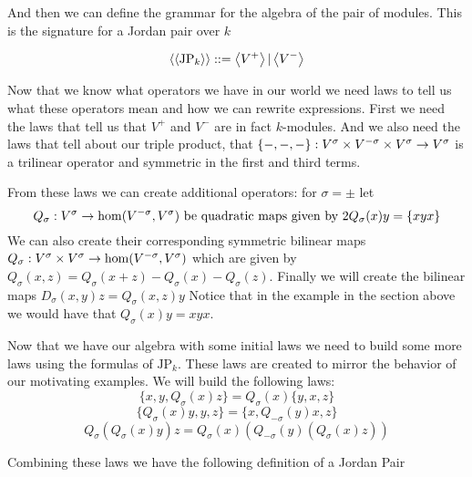 And then we can define the grammar for the algebra of the pair of modules. This is the signature for a Jordan pair over $k$

\[\left\langle \left\langle \text{JP}_k \right\rangle \right\rangle::= \left\langle V^+ \right\rangle | \left\langle V^- \right\rangle\]

Now that we know what operators we have in our world we need laws to tell us what these operators mean and how we can rewrite expressions.
First we need the laws that tell us that $V^+$ and $V^-$ are in fact $k$-modules.
And we also need the laws that tell about our triple product, that $\{-,-,-\}:V^\sigma\times V^{-\sigma}\times V^\sigma\rightarrow V^\sigma$ is a trilinear operator and symmetric in the first and third terms. 

From these laws we can create additional operators: for $\sigma=\pm$ let
\[Q_\sigma:V^\sigma\rightarrow \hom(V^{-\sigma},V^{\sigma})\text{ be quadratic maps given by }2Q_\sigma(x)y = \{xyx\}\]
We can also create their corresponding symmetric bilinear maps 
$Q_\sigma:V^\sigma\times V^\sigma\rightarrow \hom(V^{-\sigma},V^{\sigma})$ which are given by 
$Q_\sigma(x,z)=Q_\sigma(x+z)-Q_\sigma(x)-Q_\sigma(z)$. %
Finally we will create the bilinear maps $D_\sigma(x,y)z=Q_\sigma(x,z)y$
Notice that in the example in the section above we would have that $Q_\sigma(x)y=xyx$.

Now that we have our algebra with some initial laws we need to build some more laws using the formulas of $\text{JP}_k$.
These laws are created to mirror the behavior of our motivating examples.
We will build the following laws:
\begin{equation}
    \tag{JP1}
    \{x,y,Q_\sigma(x)z\}=Q_\sigma(x)\{y,x,z\}
\end{equation}
\begin{equation}
    \tag{JP2}
    \{Q_\sigma(x)y,y,z\}=\{x,Q_{-\sigma}(y)x,z\}
\end{equation}
\begin{equation}
    \tag{JP3}
    Q_{\sigma}(Q_{\sigma}(x)y)z=Q_{\sigma}(x)(Q_{-\sigma}(y)(Q_{\sigma}(x)z))
\end{equation}


Combining these laws we have the following definition of a Jordan Pair

